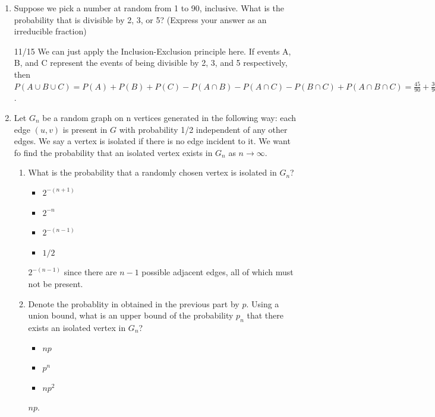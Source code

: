 \documentclass[11pt, preview]{standalone} %
\begin{document}
\begin{enumerate}
\item Suppose we pick a number at random from 1 to 90, inclusive. What is the probability that is divisible by 2, 3, or 5? (Express your answer as an irreducible fraction)
\begin{Freeform}{11/15}
\Solution We can just apply the Inclusion-Exclusion principle here. If events A, B, and C represent the events of being
divisible by 2, 3, and 5 respectively, then
$P(A \cup B \cup C) = P(A) + P(B) + P(C) - P(A \cap B) - P(A \cap C) - P(B \cap C) + P(A \cap B \cap C) = \frac{45}{90} + \frac{30}{90} + \frac{18}{90} - \frac{15}{90} - \frac{9}{90} - \frac{6}{90} + \frac{3}{90} = \frac{66}{90}$.
\end{Freeform}

\item Let $G_n$ be a random graph on n vertices generated in the following way: each edge $(u, v)$ is present in $G$ with probability 1/2 independent of any other edges. We say a vertex is isolated if there is no edge incident to it. We want fo find the probability that an isolated vertex exists in $G_n$ as $n \rightarrow \infty$.

\begin{enumerate}
\item What is the probability that a randomly chosen vertex is isolated in $G_n$?
\begin{Choices}
\begin{itemize}
\FalseChoice\item $2^{-(n+1)} $   
\FalseChoice\item $2^{-n}$
\TrueChoice\item $2^{-(n-1)}$
\FalseChoice\item $1/2$
\end{itemize}
\Solution $2^{-(n-1)}$ since there are $n-1$ possible adjacent edges, all of which must not be present. 
\end{Choices}

\item Denote the probablity in obtained in the previous part by $p$. Using a union bound, what is an upper bound of the probability $p_n$ that there exists an isolated vertex in $G_n$? 
\begin{Choices}
\begin{itemize}
\TrueChoice\item $np$
\FalseChoice\item $p^n$   
\FalseChoice\item $np^2$
\end{itemize}
\Solution $np$. 
\end{Choices}


\end{enumerate}
\end{enumerate}
\end{document}
